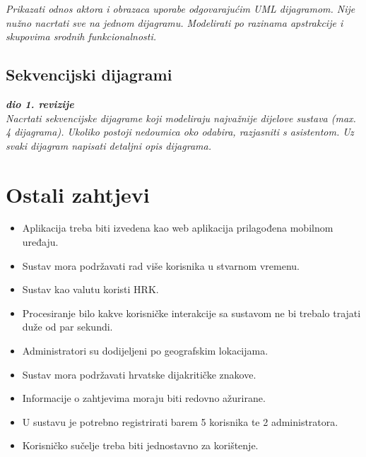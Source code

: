 					\textit{Prikazati odnos aktora i obrazaca uporabe odgovarajućim UML dijagramom. Nije nužno nacrtati sve na jednom dijagramu. Modelirati po razinama apstrakcije i skupovima srodnih funkcionalnosti.}
				\eject		
				
			\subsection{Sekvencijski dijagrami}
				
				\textbf{\textit{dio 1. revizije}}\\
				
				\textit{Nacrtati sekvencijske dijagrame koji modeliraju najvažnije dijelove sustava (max. 4 dijagrama). Ukoliko postoji nedoumica oko odabira, razjasniti s asistentom. Uz svaki dijagram napisati detaljni opis dijagrama.}
				\eject
	
		\section{Ostali zahtjevi}
		
		\begin{itemize}
			\item Aplikacija treba biti izvedena kao web aplikacija prilagođena mobilnom uređaju.
			\item Sustav mora podržavati rad više korisnika u stvarnom vremenu.
			\item Sustav kao valutu koristi HRK.
			\item Procesiranje bilo kakve korisničke interakcije sa sustavom ne bi trebalo trajati duže od par sekundi.
			\item Administratori su dodijeljeni po geografskim lokacijama.
			\item Sustav mora podržavati hrvatske dijakritičke znakove.
			\item Informacije o zahtjevima moraju biti redovno ažurirane.
			\item U sustavu je potrebno registrirati barem 5 korisnika te 2 administratora.
			\item Korisničko sučelje treba biti jednostavno za korištenje.
		\end{itemize}
			 
			 
			 
	